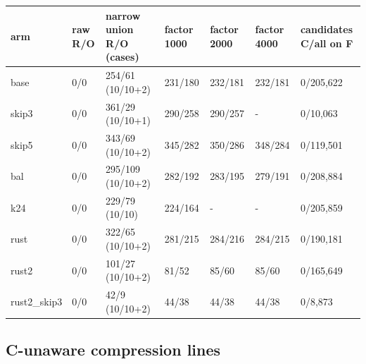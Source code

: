\documentclass[10pt,a4paper]{article}
\begin{document}
{\small\setlength{\tabcolsep}{2pt}\begin{longtable}{|p{1.93cm}|p{1.47cm}|p{3.08cm}|p{1.93cm}|p{1.93cm}|p{1.93cm}|p{2.84cm}|}\hline
\textbf{arm} & \textbf{raw R/\allowbreak{}O} & \textbf{narrow union R/\allowbreak{}O (cases)} & \textbf{factor 1000} & \textbf{factor 2000} & \textbf{factor 4000} & \textbf{candidates C/\allowbreak{}all on F}\\\hline\endhead
base & 0/\allowbreak{}0 & 254/\allowbreak{}61 (10/\allowbreak{}10+2) & 231/\allowbreak{}180 & 232/\allowbreak{}181 & 232/\allowbreak{}181 & 0/\allowbreak{}205,622\\\hline
skip3 & 0/\allowbreak{}0 & 361/\allowbreak{}29 (10/\allowbreak{}10+1) & 290/\allowbreak{}258 & 290/\allowbreak{}257 & - & 0/\allowbreak{}10,063\\\hline
skip5 & 0/\allowbreak{}0 & 343/\allowbreak{}69 (10/\allowbreak{}10+2) & 345/\allowbreak{}282 & 350/\allowbreak{}286 & 348/\allowbreak{}284 & 0/\allowbreak{}119,501\\\hline
bal & 0/\allowbreak{}0 & 295/\allowbreak{}109 (10/\allowbreak{}10+2) & 282/\allowbreak{}192 & 283/\allowbreak{}195 & 279/\allowbreak{}191 & 0/\allowbreak{}208,884\\\hline
k24 & 0/\allowbreak{}0 & 229/\allowbreak{}79 (10/\allowbreak{}10) & 224/\allowbreak{}164 & - & - & 0/\allowbreak{}205,859\\\hline
rust & 0/\allowbreak{}0 & 322/\allowbreak{}65 (10/\allowbreak{}10+2) & 281/\allowbreak{}215 & 284/\allowbreak{}216 & 284/\allowbreak{}215 & 0/\allowbreak{}190,181\\\hline
rust2 & 0/\allowbreak{}0 & 101/\allowbreak{}27 (10/\allowbreak{}10+2) & 81/\allowbreak{}52 & 85/\allowbreak{}60 & 85/\allowbreak{}60 & 0/\allowbreak{}165,649\\\hline
rust2\_skip3 & 0/\allowbreak{}0 & 42/\allowbreak{}9 (10/\allowbreak{}10+2) & 44/\allowbreak{}38 & 44/\allowbreak{}38 & 44/\allowbreak{}38 & 0/\allowbreak{}8,873\\\hline
\end{longtable}}

\subsection{C-unaware compression lines}
\end{document}
